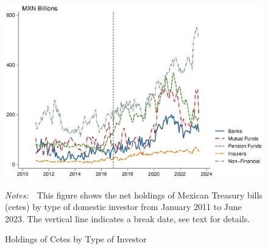 \documentclass[a4paper, 12pt]{article}
\newcommand{\figtext}[1]{
	\vspace{-1ex}
	\captionsetup{justification=justified,font=footnotesize}
	\caption*{#1}
}
\newcommand{\fignotes}[1]{\figtext{\emph{Notes:~}~#1}}
\providecommand{\lastobsflwbdm}{June 2023}
\begin{document}
\begin{appendices}
	\begin{figure}[b]
		\caption{Holdings of Cetes by Type of Investor} \label{fig:categscts}
		\begin{center}
			\begin{minipage}{0.9\linewidth}
				\begin{center}
					\includegraphics[width=1\textwidth,height=.3\textheight]{../Figures/categscts} \\
				\end{center}
				\fignotes{This figure shows the net holdings of Mexican Treasury bills (cetes) by type of domestic investor from January 2011 to \lastobsflwbdm. The vertical line indicates a break date, see text for details.}
			\end{minipage}
		\end{center}
	\end{figure}
	

\end{appendices}
\end{document}

